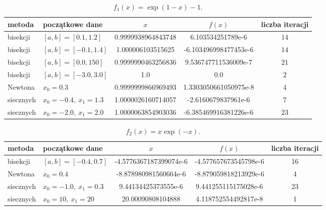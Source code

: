 \documentclass{classrep}
\begin{document}
		\begin{table}[!hpbt]
        		\centering
        		\footnotesize
			\begin{tabular}{llSSc} \toprule
				{metoda} & {początkowe dane} &{$x$} & {$f(x)$} & {liczba iteracji}\\ \midrule
				bisekcji & $[a,b]=[0.1,1.2]$ & 0.9999938964843748 & 6.103534251789e-6 & $14$ \\ 
				bisekcji & $[a,b]=[-0.1,1.4]$ & 1.000006103515625 & -6.103496998477453e-6 & $14$ \\ 
				bisekcji & $[a,b]=[0.0,150]$ & 0.9999990463256836 & 9.536747711536009e-7 & $21$ \\
				bisekcji & $[a,b]=[-3.0,3.0]$ & 1.0 & 0.0 & $2$ \\ 
	 			Newtona & $x_0=0.3$ & 0.9999999866969493 & 1.3303050661050975e-8 & $4$ \\
	 			siecznych & $x_0=-0.4,~x_1=1.3$ & 1.0000026160714057 & -2.6160679837961e-6 & $7$ \\ 
	 			siecznych & $x_0=-2.0,~x_1=2.0$ & 1.0000063854903036 & -6.385469916381226e-6 & $23$ \\ \bottomrule
	 		\end{tabular}
	 		\caption{$f_1(x)=\exp(1-x)-1$.}
			\label{table:3}
		\end{table}
		
		\begin{table}[!hpbt]
        		\centering
        		\footnotesize
			\begin{tabular}{llSSc} \toprule
				{metoda} & {początkowe dane} &{$x$} & {$f(x)$} & {liczba iteracji}\\ \midrule
				bisekcji & $[a,b]=[-0.4,0.7]$ & -4.5776367187399074e-6 & -4.577657673545798e-6 & 16 \\ 
	 			Newtona & $x_0=0.4$ & -8.878980981560664e-6 & -8.879059818213929e-6 & 4 \\  	
	 			siecznych & $x_0=-1.0,~x_1=0.3$ & 9.44134425373555e-6 & 9.441255115175028e-6 & 23 \\
	 			siecznych & $x_0=10,~x_1=20$ & 20.00090808104888 & 4.118752554492817e-8 & 1 \\ \bottomrule
	 		\end{tabular}
	 		\caption{$f_2(x)=x\exp(-x)$.}
			\label{table:4}			
		\end{table}	
\end{document}
